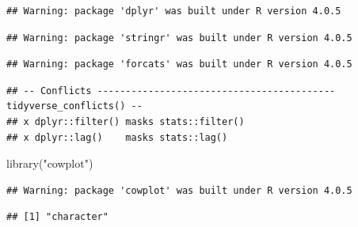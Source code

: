 \documentclass[
]{article}
\newenvironment{Shaded}{\begin{snugshade}}{\end{snugshade}}
\newcommand{\CommentTok}[1]{\textcolor[rgb]{0.56,0.35,0.01}{\textit{#1}}}
\newcommand{\FunctionTok}[1]{\textcolor[rgb]{0.00,0.00,0.00}{#1}}
\newcommand{\NormalTok}[1]{#1}
\newcommand{\OtherTok}[1]{\textcolor[rgb]{0.56,0.35,0.01}{#1}}
\newcommand{\SpecialCharTok}[1]{\textcolor[rgb]{0.00,0.00,0.00}{#1}}
\newcommand{\StringTok}[1]{\textcolor[rgb]{0.31,0.60,0.02}{#1}}
\begin{document}
\begin{verbatim}
## Warning: package 'dplyr' was built under R version 4.0.5
\end{verbatim}

\begin{verbatim}
## Warning: package 'stringr' was built under R version 4.0.5
\end{verbatim}

\begin{verbatim}
## Warning: package 'forcats' was built under R version 4.0.5
\end{verbatim}

\begin{verbatim}
## -- Conflicts ------------------------------------------ tidyverse_conflicts() --
## x dplyr::filter() masks stats::filter()
## x dplyr::lag()    masks stats::lag()
\end{verbatim}

\begin{Shaded}
\begin{Highlighting}[]
\FunctionTok{library}\NormalTok{(}\StringTok{"cowplot"}\NormalTok{)}
\end{Highlighting}
\end{Shaded}

\begin{verbatim}
## Warning: package 'cowplot' was built under R version 4.0.5
\end{verbatim}

\begin{Shaded}
\end{Shaded}

\begin{verbatim}
## [1] "character"
\end{verbatim}

\begin{Shaded}
\end{Shaded}
\end{document}
